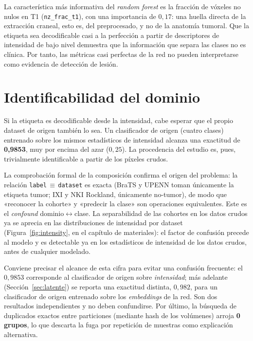 La característica más informativa del \emph{random forest} es la fracción de
vóxeles no nulos en T1 (\texttt{nz\_frac\_t1}), con una importancia de $0{,}17$:
una huella directa de la extracción craneal, esto es, del preprocesado, y no de
la anatomía tumoral. Que la etiqueta sea decodificable casi a la perfección a
partir de descriptores de intensidad de bajo nivel demuestra que la información
que separa las clases no es clínica. Por tanto, las métricas casi perfectas de
la red no pueden interpretarse como evidencia de detección de lesión.

\section{Identificabilidad del dominio}

Si la etiqueta es decodificable desde la intensidad, cabe esperar que el propio
dataset de origen también lo sea. Un clasificador de origen (cuatro clases)
entrenado sobre los mismos estadísticos de intensidad alcanza una exactitud de
\textbf{0,9853}, muy por encima del azar ($0{,}25$). La procedencia del estudio
es, pues, trivialmente identificable a partir de los píxeles crudos.

La comprobación formal de la composición confirma el origen del problema: la
relación \texttt{label}\,$\equiv$\,\texttt{dataset} es exacta (BraTS y UPENN
toman únicamente la etiqueta tumor; IXI y NKI Rockland, únicamente no-tumor), de
modo que «reconocer la cohorte» y «predecir la clase» son operaciones
equivalentes. Este es el \emph{confound} dominio$\leftrightarrow$clase. La
separabilidad de las cohortes en los datos crudos ya se aprecia en las
distribuciones de intensidad por dataset (Figura~\ref{fig:intensity}, en el
capítulo de materiales): el factor de confusión precede al modelo y es detectable
ya en los estadísticos de intensidad de los datos crudos, antes de cualquier
modelado.

Conviene precisar el alcance de esta cifra para evitar una confusión frecuente:
el $0{,}9853$ corresponde al clasificador de origen sobre \emph{intensidad}; más
adelante (Sección~\ref{sec:latente}) se reporta una exactitud distinta,
$0{,}982$, para un clasificador de origen entrenado sobre los \emph{embeddings}
de la red. Son dos resultados independientes y no deben confundirse. Por último,
la búsqueda de duplicados exactos entre particiones (mediante hash de los
volúmenes) arroja \textbf{0 grupos}, lo que descarta la fuga por repetición de
muestras como explicación alternativa.

